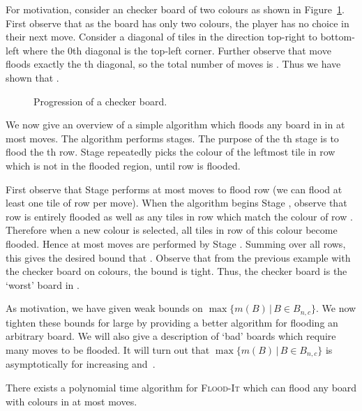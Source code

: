 \documentclass[a4paper,11pt]{llncs}
\newcommand{\pgfgraphic}[1]{}
\newcounter{l}
\newcommand{\Floodit}{\textsc{Flood-It}}
\newcommand{\Mnc}{\ensuremath{\max\{m(B)\,|\,B \in B_{n,c}\}}}
\newcommand{\recdim}[2]{}
\begin{document}
For motivation, consider an \recdim{n}{n} checker board of two colours as shown in Figure~\ref{fig:uplow}. First observe that as the board has only two colours, the player has no choice in their next move. Consider a diagonal of tiles in the direction top-right to bottom-left where the 0th diagonal is the top-left corner. Further observe that move  floods exactly the th diagonal, so the total number of moves is . Thus we have shown that .

\begin{figure}[t]
\centering
	\pgfgraphic{graphic-checker}
\caption{Progression of a \recdim{6}{6} checker board. }
\label{fig:uplow}
\end{figure}

We now give an overview of a simple algorithm which floods any board in  in at most  moves. The algorithm performs  stages. The purpose of the th stage is to flood the th row.  Stage  repeatedly picks the colour of the leftmost tile in row  which is not in the flooded region, until row  is flooded.

First observe that Stage  performs at most  moves to flood row  (we can flood at least one tile of row  per move). When the algorithm begins Stage , observe that row  is entirely flooded as well as any tiles in row  which match the colour of row . Therefore when a new colour is selected, all tiles in row  of this colour become flooded. Hence at most  moves are performed by Stage . Summing over all rows, this gives the desired bound that . Observe that from the previous example with the checker board on  colours, the bound  is tight. Thus, the checker board is the `worst' board in .

As motivation, we have given weak bounds on \Mnc{}. We now tighten these bounds for large  by providing a better algorithm for flooding an arbitrary board. We will also give a description of `bad' boards which require many moves to be flooded. It will turn out that \Mnc{} is asymptotically  for increasing  and~.

\newcommand{\rem}{\text{rem}}
\begin{theorem} \label{thm:good}
There exists a polynomial time algorithm for \Floodit{} which can flood any \recdim{n}{n} board with  colours in at most  moves.
\end{theorem}
\end{document}
